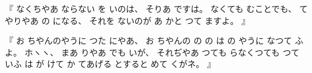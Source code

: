 %
『
なくちやあ
ならない
を
いのは、
%
そりあ
ですは。
%
なくても
むことでも、
%
て
やりやあ
の
になる、
%
それを
ないのが
あ
かと
つて
ますよ。
』

%
『
お
ちやんのやうに
つた
にやあ、
%
お
ちやんの
の
の
は
の
やうに
なつて
ふよ。
%
ホヽヽ、
%
まあ
りやあ
でも
いが、
%
それぢやあ
つても
らなくつても
つて
いふ
は
が
けて
か
てあげる
とすると
めて
くがネ。
』
